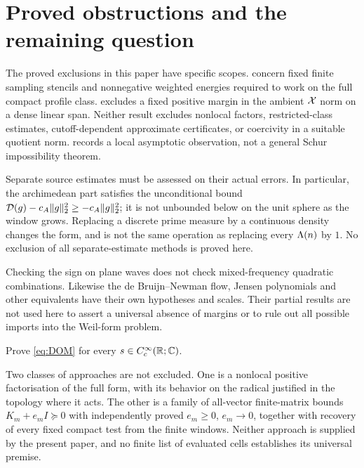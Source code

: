 \section{Proved obstructions and the remaining question}\label{sec:ledger}

The proved exclusions in this paper have specific scopes.
 concern fixed finite sampling stencils
and nonnegative weighted energies required to work on the full
compact profile class.  excludes a fixed positive
margin in the ambient $\mathcal X$ norm on a dense linear span. Neither
result excludes nonlocal factors, restricted-class estimates,
cutoff-dependent approximate certificates, or coercivity in a
suitable quotient norm.  records a local asymptotic
observation, not a general Schur impossibility theorem.

Separate source estimates must be assessed on their actual errors.
In particular, the archimedean part satisfies the unconditional bound
$\mathcal D(g)-c_A\|g\|_2^2\ge-c_A\|g\|_2^2$; it is not unbounded below on
the unit sphere as the window grows. Replacing a discrete prime
measure by a continuous density changes the form, and is not the
same operation as replacing every $\Lambda(n)$ by $1$. No exclusion of
all separate-estimate methods is proved here.

Checking the sign on plane waves does not check mixed-frequency
quadratic combinations. Likewise the de Bruijn--Newman flow, Jensen
polynomials and other equivalents have their own hypotheses and
scales. Their partial results are not used here to assert a universal
absence of margins or to rule out all possible imports into the
Weil-form problem.

\begin{problem}\label{prob:DOM}
Prove \eqref{eq:DOM} for every $s\in C_c^\infty(\mathbb R;\mathbb C)$.
\end{problem}

Two classes of approaches are not excluded. One is a nonlocal
positive factorisation of the full form, with its behavior on the
radical justified in the topology where it acts. The other is a
family of all-vector finite-matrix bounds
$K_m+e_mI\succeq0$ with independently proved $e_m\ge0$, $e_m\to0$,
together with recovery of every fixed compact test from the finite
windows. Neither approach is supplied by the present paper, and no
finite list of evaluated cells establishes its universal premise.
